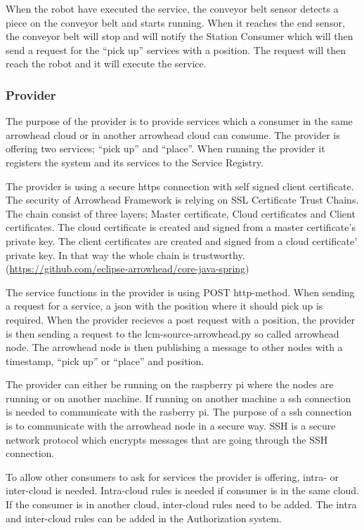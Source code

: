 When the robot have executed the service, the conveyor belt sensor detects a piece on the conveyor belt and starts running.  
When it reaches the end sensor, the conveyor belt will stop and will notify the Station Consumer which will then send a request for the ``pick up'' services with a position.  
The request will then reach the robot and it will execute the service. 

\subsubsection{Provider}
The purpose of the provider is to provide services which a consumer in the same arrowhead cloud or in another arrowhead cloud can consume. The provider is offering two services; ``pick up'' and ``place''.
When running the provider it registers the system and its services to the Service Registry. 

The provider is using a secure https connection with self signed client certificate.  
The security of Arrowhead Framework is relying on SSL Certificate Trust Chains.  
The chain consist of three layers; Master certificate, Cloud certificates and Client certificates.  
The cloud certificate is created and signed from a master certificate's private key.  
The client certificates are created and signed from a cloud certificate' private key.  
In that way the whole chain is trustworthy. (\url{https://github.com/eclipse-arrowhead/core-java-spring})

The service functions in the provider is using POST http-method. 
When sending a request for a service, a json with the position where it should pick up is required.  
When the provider recieves a post request with a position, the provider is then sending a request to the lcm-source-arrowhead.py so called arrowhead node. 
The arrowhead node is then publishing a message to other nodes with a timestamp, ``pick up'' or ``place'' and position. 

The provider can either be running on the raspberry pi where the nodes are running or on another machine. 
If running on another machine a ssh connection is needed to communicate with the rasberry pi. 
The purpose of a ssh connection is to communicate with the arrowhead node in a secure way.  
SSH is a secure network protocol which encrypts messages that are going through the SSH connection.  

To allow other consumers to ask for services the provider is offering, intra- or inter-cloud is needed.  
Intra-cloud rules is needed if consumer is in the same cloud. 
If the consumer is in another cloud, inter-cloud rules need to be added. 
The intra and inter-cloud rules can be added in the Authorization system. 

